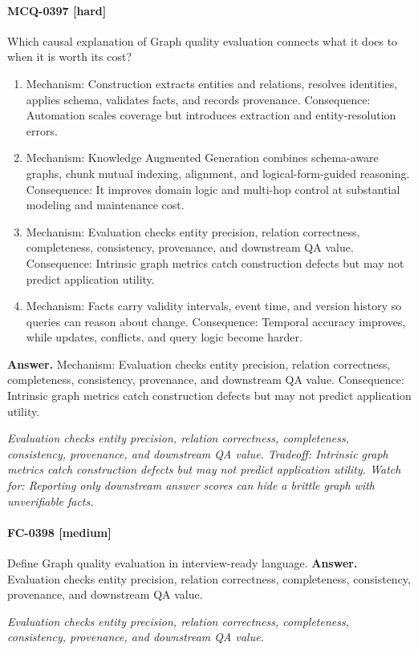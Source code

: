 \paragraph{MCQ-0397 [hard]} Which causal explanation of Graph quality evaluation connects what it does to when it is worth its cost?
\begin{enumerate}[label=\Alph*.]
\item Mechanism: Construction extracts entities and relations, resolves identities, applies schema, validates facts, and records provenance. Consequence: Automation scales coverage but introduces extraction and entity-resolution errors.
\item Mechanism: Knowledge Augmented Generation combines schema-aware graphs, chunk mutual indexing, alignment, and logical-form-guided reasoning. Consequence: It improves domain logic and multi-hop control at substantial modeling and maintenance cost.
\item Mechanism: Evaluation checks entity precision, relation correctness, completeness, consistency, provenance, and downstream QA value. Consequence: Intrinsic graph metrics catch construction defects but may not predict application utility.
\item Mechanism: Facts carry validity intervals, event time, and version history so queries can reason about change. Consequence: Temporal accuracy improves, while updates, conflicts, and query logic become harder.
\end{enumerate}
\noindent\textbf{Answer.} Mechanism: Evaluation checks entity precision, relation correctness, completeness, consistency, provenance, and downstream QA value. Consequence: Intrinsic graph metrics catch construction defects but may not predict application utility.
\par\textit{Evaluation checks entity precision, relation correctness, completeness, consistency, provenance, and downstream QA value. Tradeoff: Intrinsic graph metrics catch construction defects but may not predict application utility. Watch for: Reporting only downstream answer scores can hide a brittle graph with unverifiable facts.}
\paragraph{FC-0398 [medium]} Define Graph quality evaluation in interview-ready language.
\noindent\textbf{Answer.} Evaluation checks entity precision, relation correctness, completeness, consistency, provenance, and downstream QA value.
\par\textit{Evaluation checks entity precision, relation correctness, completeness, consistency, provenance, and downstream QA value.}
